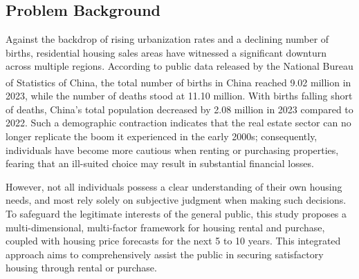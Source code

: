 \documentclass{mcmthesis}
\begin{document}
\subsection{Problem Background}
Against the backdrop of rising urbanization rates and a declining number of births, 
residential housing sales areas have witnessed a significant downturn across multiple regions.
According to public data released by the National Bureau of Statistics of China\textsuperscript{\cite{1}}, the total number of births in China reached 9.02 million in 2023, 
while the number of deaths stood at 11.10 million. With births falling short of deaths, 
China's total population decreased by 2.08 million in 2023 compared to 2022. 
Such a demographic contraction indicates that the real estate sector can no longer replicate the boom it experienced in the early 2000s; consequently, 
individuals have become more cautious when renting or purchasing properties, fearing that an ill-suited choice may result in substantial financial losses.

However, not all individuals possess a clear understanding of their own housing needs, 
and most rely solely on subjective judgment when making such decisions. To safeguard the legitimate interests of the general public, this study proposes a multi-dimensional, 
multi-factor framework for housing rental and purchase, coupled with housing price forecasts for the next 5 to 10 years. 
This integrated approach aims to comprehensively assist the public in securing satisfactory housing through rental or purchase.
\end{document}
